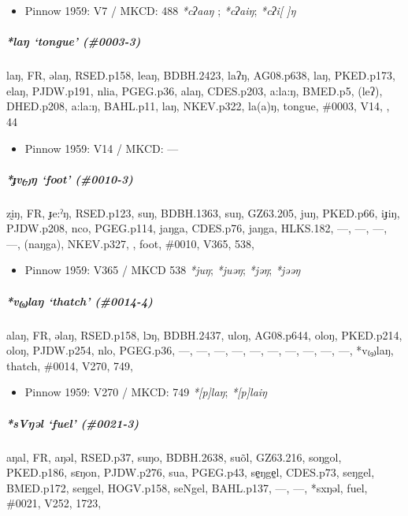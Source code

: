 \documentclass[a4paper,]{article}
\providecommand{\tightlist}{%
  \setlength{\itemsep}{0pt}\setlength{\parskip}{0pt}}
\let\oldsubparagraph\subparagraph
\renewcommand{\subparagraph}[1]{\oldsubparagraph{#1}\mbox{}}
\begin{document}
\begin{itemize}
\tightlist
\item
  Pinnow 1959: V7 / MKCD: 488 \emph{*cʔaaŋ} ; \emph{*cʔaiŋ};
  \emph{*cʔi{[} {]}ŋ}
\end{itemize}

\subparagraph{\texorpdfstring{\emph{*laŋ} `tongue'
(\#0003-3)}{*laŋ tongue (\#0003-3)}}\label{laux14b-tongue-0003-3}

laŋ, FR, əlaŋ, RSED.p158, leaŋ, BDBH.2423, laʔŋ, AG08.p638, laŋ,
PKED.p173, elaŋ, PJDW.p191, nlia, PGEG.p36, alaŋ, CDES.p203, a:la:ŋ,
BMED.p5, (leʔ), DHED.p208, a:la:ŋ, BAHL.p11, laŋ, NKEV.p322, la(a)ŋ,
tongue, \#0003, V14, , 44

\begin{itemize}
\tightlist
\item
  Pinnow 1959: V14 / MKCD: ---
\end{itemize}

\subparagraph{\texorpdfstring{\emph{*ɟv₍₇₎ŋ} `foot'
(\#0010-3)}{*ɟv₍₇₎ŋ foot (\#0010-3)}}\label{ux25fvux14b-foot-0010-3}

zḭŋ, FR, ɟe:ˀŋ, RSED.p123, suŋ, BDBH.1363, suŋ, GZ63.205, juŋ, PKED.p66,
iɟiŋ, PJDW.p208, nco, PGEG.p114, jaŋga, CDES.p76, jaŋga, HLKS.182, ---,
---, ---, ---, (naŋga), NKEV.p327, , foot, \#0010, V365, 538,

\begin{itemize}
\tightlist
\item
  Pinnow 1959: V365 / MKCD 538 \emph{*juŋ}; \emph{*juəŋ}; \emph{*jəŋ};
  \emph{*jəəŋ}
\end{itemize}

\subparagraph{\texorpdfstring{\emph{*v₍₉₎laŋ} `thatch'
(\#0014-4)}{*v₍₉₎laŋ thatch (\#0014-4)}}\label{vlaux14b-thatch-0014-4}

alaŋ, FR, əlaŋ, RSED.p158, lɔŋ, BDBH.2437, uloŋ, AG08.p644, oloŋ,
PKED.p214, oloŋ, PJDW.p254, nlo, PGEG.p36, ---, ---, ---, ---, ---, ---,
---, ---, ---, ---, *v₍₉₎laŋ, thatch, \#0014, V270, 749,

\begin{itemize}
\tightlist
\item
  Pinnow 1959: V270 / MKCD: 749 \emph{*{[}p{]}laŋ}; \emph{*{[}p{]}laiŋ}
\end{itemize}

\subparagraph{\texorpdfstring{\emph{*sVŋəl} `fuel'
(\#0021-3)}{*sVŋəl fuel (\#0021-3)}}\label{svux14bux259l-fuel-0021-3}

aŋal, FR, aŋəl, RSED.p37, suŋo, BDBH.2638, suõl, GZ63.216, soŋgol,
PKED.p186, sɛŋon, PJDW.p276, sua, PGEG.p43, se̠ŋge̠l, CDES.p73, seŋgel,
BMED.p172, seŋgel, HOGV.p158, seNgel, BAHL.p137, ---, ---, *sxŋəl, fuel,
\#0021, V252, 1723,
\end{document}
